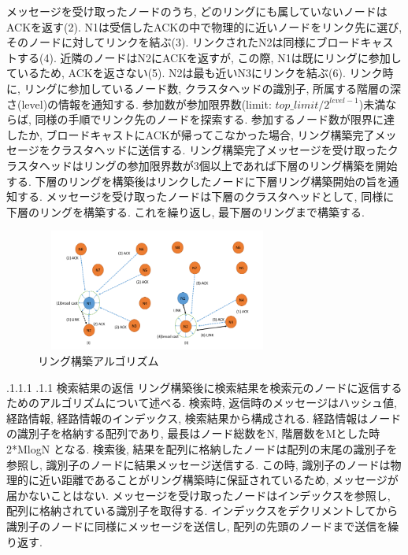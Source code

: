 \documentclass[a4paper, twocolumn]{jarticle}
\makeatletter
\def\section{\@startsection{section}{1}{\z@}%
 {.1\Cvs \@plus.1\Cdp \@minus.1\Cdp}%
 {.1\Cvs \@plus.1\Cdp}%
 {\normalfont\normalsize\bfseries}}
\makeatother
\begin{document}
メッセージを受け取ったノードのうち, どのリングにも属していないノードはACKを返す(2).
N1は受信したACKの中で物理的に近いノードをリンク先に選び, そのノードに対してリンクを結ぶ(3).
リンクされたN2は同様にブロードキャストする(4).
近隣のノードはN2にACKを返すが, この際, N1は既にリングに参加しているため, ACKを返さない(5).
N2は最も近いN3にリンクを結ぶ(6).
リンク時に, リングに参加しているノード数, クラスタヘッドの識別子, 所属する階層の深さ(level)の情報を通知する.
参加数が参加限界数(limit: \begin{math} top\_limit / 2^{level-1} \end{math})未満ならば, 同様の手順でリンク先のノードを探索する.
参加するノード数が限界に達したか, ブロードキャストにACKが帰ってこなかった場合, リング構築完了メッセージをクラスタヘッドに送信する.
リング構築完了メッセージを受け取ったクラスタヘッドはリングの参加限界数が3個以上であれば下層のリング構築を開始する.
下層のリングを構築後はリンクしたノードに下層リング構築開始の旨を通知する. 
メッセージを受け取ったノードは下層のクラスタヘッドとして, 同様に下層のリングを構築する.
これを繰り返し, 最下層のリングまで構築する.
\begin{figure}[htbp]
	\begin{center}
	\includegraphics[width=8cm, height=4cm]{DAAS_CSN_5.png}
	\end{center}
	\caption{リング構築アルゴリズム}\label{fig:ring_struct_algorithm}
\end{figure}

\section{検索結果の返信}
リング構築後に検索結果を検索元のノードに返信するためのアルゴリズムについて述べる.
検索時, 返信時のメッセージはハッシュ値, 経路情報, 経路情報のインデックス, 検索結果から構成される.
経路情報はノードの識別子を格納する配列であり, 最長はノード総数をN, 階層数をMとした時 2*MlogN となる.
検索後, 結果を配列に格納したノードは配列の末尾の識別子を参照し, 識別子のノードに結果メッセージ送信する.
この時, 識別子のノードは物理的に近い距離であることがリング構築時に保証されているため, メッセージが届かないことはない.
メッセージを受け取ったノードはインデックスを参照し, 配列に格納されている識別子を取得する.
インデックスをデクリメントしてから識別子のノードに同様にメッセージを送信し, 配列の先頭のノードまで送信を繰り返す. 
\end{document}
